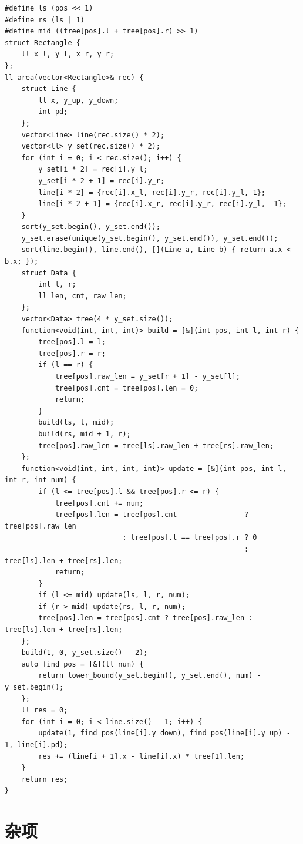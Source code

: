 \documentclass[UTF8, twoside]{ctexart}
\begin{document}
\begin{sloppypar}
\begin{lstlisting}[style=cpp]
#define ls (pos << 1)
#define rs (ls | 1)
#define mid ((tree[pos].l + tree[pos].r) >> 1)
struct Rectangle {
    ll x_l, y_l, x_r, y_r;
};
ll area(vector<Rectangle>& rec) {
    struct Line {
        ll x, y_up, y_down;
        int pd;
    };
    vector<Line> line(rec.size() * 2);
    vector<ll> y_set(rec.size() * 2);
    for (int i = 0; i < rec.size(); i++) {
        y_set[i * 2] = rec[i].y_l;
        y_set[i * 2 + 1] = rec[i].y_r;
        line[i * 2] = {rec[i].x_l, rec[i].y_r, rec[i].y_l, 1};
        line[i * 2 + 1] = {rec[i].x_r, rec[i].y_r, rec[i].y_l, -1};
    }
    sort(y_set.begin(), y_set.end());
    y_set.erase(unique(y_set.begin(), y_set.end()), y_set.end());
    sort(line.begin(), line.end(), [](Line a, Line b) { return a.x < b.x; });
    struct Data {
        int l, r;
        ll len, cnt, raw_len;
    };
    vector<Data> tree(4 * y_set.size());
    function<void(int, int, int)> build = [&](int pos, int l, int r) {
        tree[pos].l = l;
        tree[pos].r = r;
        if (l == r) {
            tree[pos].raw_len = y_set[r + 1] - y_set[l];
            tree[pos].cnt = tree[pos].len = 0;
            return;
        }
        build(ls, l, mid);
        build(rs, mid + 1, r);
        tree[pos].raw_len = tree[ls].raw_len + tree[rs].raw_len;
    };
    function<void(int, int, int, int)> update = [&](int pos, int l, int r, int num) {
        if (l <= tree[pos].l && tree[pos].r <= r) {
            tree[pos].cnt += num;
            tree[pos].len = tree[pos].cnt                ? tree[pos].raw_len
                            : tree[pos].l == tree[pos].r ? 0
                                                         : tree[ls].len + tree[rs].len;
            return;
        }
        if (l <= mid) update(ls, l, r, num);
        if (r > mid) update(rs, l, r, num);
        tree[pos].len = tree[pos].cnt ? tree[pos].raw_len : tree[ls].len + tree[rs].len;
    };
    build(1, 0, y_set.size() - 2);
    auto find_pos = [&](ll num) {
        return lower_bound(y_set.begin(), y_set.end(), num) - y_set.begin();
    };
    ll res = 0;
    for (int i = 0; i < line.size() - 1; i++) {
        update(1, find_pos(line[i].y_down), find_pos(line[i].y_up) - 1, line[i].pd);
        res += (line[i + 1].x - line[i].x) * tree[1].len;
    }
    return res;
}
\end{lstlisting}

\clearpage

\section{杂项}


\end{sloppypar}
\end{document}
